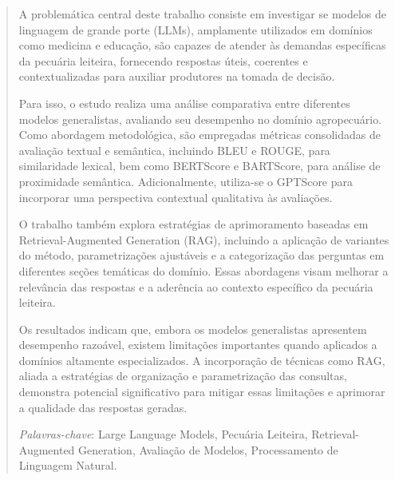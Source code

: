 \begin{abstract}
A problemática central deste trabalho consiste em investigar se modelos de linguagem de grande porte (LLMs), amplamente utilizados em domínios como medicina e educação, são capazes de atender às demandas específicas da pecuária leiteira, fornecendo respostas úteis, coerentes e contextualizadas para auxiliar produtores na tomada de decisão. 

Para isso, o estudo realiza uma análise comparativa entre diferentes modelos generalistas, avaliando seu desempenho no domínio agropecuário. Como abordagem metodológica, são empregadas métricas consolidadas de avaliação textual e semântica, incluindo BLEU e ROUGE, para similaridade lexical, bem como BERTScore e BARTScore, para análise de proximidade semântica. Adicionalmente, utiliza-se o GPTScore para incorporar uma perspectiva contextual qualitativa às avaliações.

O trabalho também explora estratégias de aprimoramento baseadas em Retrieval-Augmented Generation (RAG), incluindo a aplicação de variantes do método, parametrizações ajustáveis e a categorização das perguntas em diferentes seções temáticas do domínio. Essas abordagens visam melhorar a relevância das respostas e a aderência ao contexto específico da pecuária leiteira.

Os resultados indicam que, embora os modelos generalistas apresentem desempenho razoável, existem limitações importantes quando aplicados a domínios altamente especializados. A incorporação de técnicas como RAG, aliada a estratégias de organização e parametrização das consultas, demonstra potencial significativo para mitigar essas limitações e aprimorar a qualidade das respostas geradas.

\textit{Palavras-chave}: Large Language Models, Pecuária Leiteira, Retrieval-Augmented Generation, Avaliação de Modelos, Processamento de Linguagem Natural.
\end{abstract}